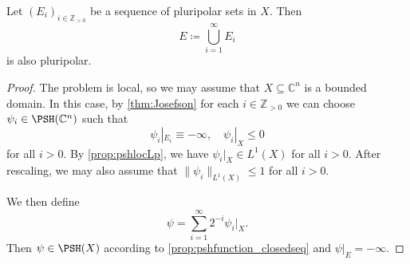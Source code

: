 \begin{proposition}\label{prop:pluripolarunion}
    Let $(E_i)_{i\in \mathbb{Z}_{>0}}$ be a sequence of pluripolar sets in $X$. Then
    \[
    E\coloneqq \bigcup_{i=1}^{\infty}E_i
    \]
    is also pluripolar.
\end{proposition}
\begin{proof}
    The problem is local, so we may assume that $X\subseteq \mathbb{C}^n$ is a bounded domain. In this case, by \cref{thm:Josefson} for each $i\in \mathbb{Z}_{>0}$ we can choose $\psi_i\in \PSH(\mathbb{C}^n)$ such that
    \[
    \psi_i|_{E_i}\equiv -\infty,\quad \psi_i|_X\leq 0
    \]
    for all $i>0$. By \cref{prop:pshlocLp}, we have $\psi_i|_X\in L^1(X)$ for all $i>0$. After rescaling, we may also assume that $\|\psi_i\|_{L^1(X)}\leq 1$ for all $i>0$.

    We then define
    \[
    \psi=\sum_{i=1}^{\infty}2^{-i} \psi_i|_X.
    \]
    Then $\psi\in \PSH(X)$ according to \cref{prop:pshfunction_closedseq} and $\psi|_{E}=-\infty$.
\end{proof}



